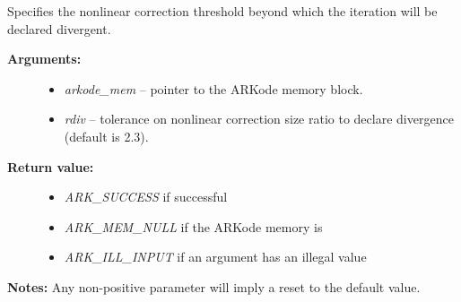 \documentclass[letterpaper,10pt,english]{sphinxmanual}
\begin{document}
\begin{fulllineitems}
\label{c_interface/User_callable:ARKodeSetNonlinRDiv}
Specifies the nonlinear correction threshold beyond which the
iteration will be declared divergent.
\begin{description}
\item[{\textbf{Arguments:}}] \leavevmode\begin{itemize}
\item {} 
\emph{arkode\_mem} -- pointer to the ARKode memory block.

\item {} 
\emph{rdiv} -- tolerance on nonlinear correction size ratio to
declare divergence (default is 2.3).

\end{itemize}

\item[{\textbf{Return value:}}] \leavevmode\begin{itemize}
\item {} 
\emph{ARK\_SUCCESS} if successful

\item {} 
\emph{ARK\_MEM\_NULL} if the ARKode memory is 

\item {} 
\emph{ARK\_ILL\_INPUT} if an argument has an illegal value

\end{itemize}

\end{description}

\textbf{Notes:} Any non-positive parameter will imply a reset to the default value.

\end{fulllineitems}

\end{document}

